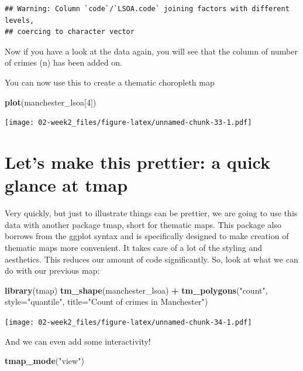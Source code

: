 \documentclass[]{book}
\newenvironment{Shaded}{\begin{snugshade}}{\end{snugshade}}
\newcommand{\DataTypeTok}[1]{\textcolor[rgb]{0.13,0.29,0.53}{#1}}
\newcommand{\DecValTok}[1]{\textcolor[rgb]{0.00,0.00,0.81}{#1}}
\newcommand{\KeywordTok}[1]{\textcolor[rgb]{0.13,0.29,0.53}{\textbf{#1}}}
\newcommand{\NormalTok}[1]{#1}
\newcommand{\OperatorTok}[1]{\textcolor[rgb]{0.81,0.36,0.00}{\textbf{#1}}}
\newcommand{\StringTok}[1]{\textcolor[rgb]{0.31,0.60,0.02}{#1}}
\begin{document}
\begin{verbatim}
## Warning: Column `code`/`LSOA.code` joining factors with different levels,
## coercing to character vector
\end{verbatim}

Now if you have a look at the data again, you will see that the column of number of crimes (n) has been added on.

You can now use this to create a thematic choropleth map

\begin{Shaded}
\begin{Highlighting}[]
\KeywordTok{plot}\NormalTok{(manchester_lsoa[}\DecValTok{4}\NormalTok{])}
\end{Highlighting}
\end{Shaded}

\texttt{[image: 02-week2\_files/figure-latex/unnamed-chunk-33-1.pdf]}

\hypertarget{lets-make-this-prettier-a-quick-glance-at-tmap}{%
\section{Let's make this prettier: a quick glance at tmap}\label{lets-make-this-prettier-a-quick-glance-at-tmap}}

Very quickly, but just to illustrate things can be prettier, we are going to use this data with another package tmap, short for thematic maps. This package also borrows from the ggplot syntax and is specifically designed to make creation of thematic maps more convenient. It takes care of a lot of the styling and aesthetics. This reduces our amount of code significantly. So, look at what we can do with our previous map:

\begin{Shaded}
\begin{Highlighting}[]
\KeywordTok{library}\NormalTok{(tmap)}
\KeywordTok{tm_shape}\NormalTok{(manchester_lsoa) }\OperatorTok{+}
\StringTok{  }\KeywordTok{tm_polygons}\NormalTok{(}\StringTok{"count"}\NormalTok{, }\DataTypeTok{style=}\StringTok{"quantile"}\NormalTok{, }\DataTypeTok{title=}\StringTok{"Count of crimes in Manchester"}\NormalTok{)}
\end{Highlighting}
\end{Shaded}

\texttt{[image: 02-week2\_files/figure-latex/unnamed-chunk-34-1.pdf]}

And we can even add some interactivity!

\begin{Shaded}
\begin{Highlighting}[]
\KeywordTok{tmap_mode}\NormalTok{(}\StringTok{"view"}\NormalTok{)}
\end{Highlighting}
\end{Shaded}
\end{document}
